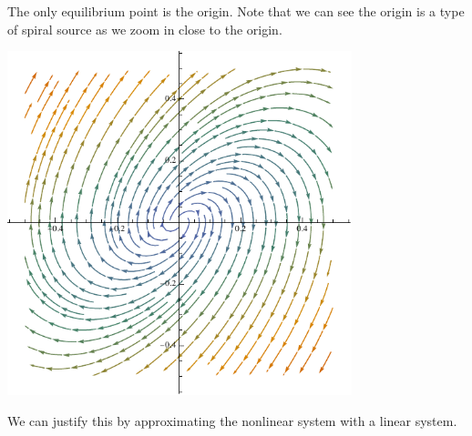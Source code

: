 \documentclass[10pt]{mypackage}
\begin{document}
The only equilibrium point is the origin. Note that we can see the origin is a type of spiral source as we zoom in close to the origin.
\begin{center}
  \includegraphics[width=10cm]{images/van_der_pol_equation_near_origin.pdf}
\end{center}
We can justify this by approximating the nonlinear system with a linear system.\newline
\end{document}
